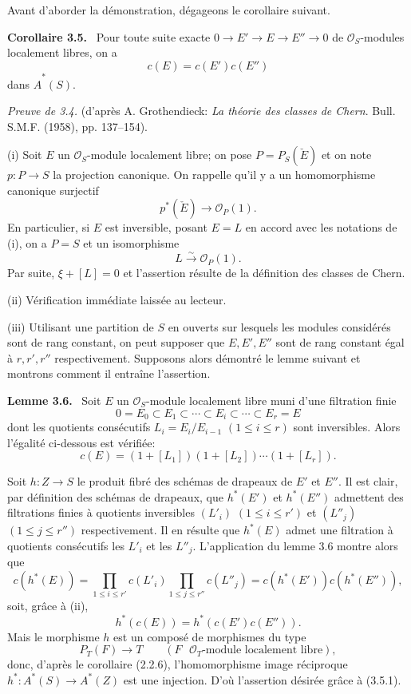 \documentclass[11pt]{article}
\newenvironment{statement}[1]{\par\medskip\noindent\textbf{#1.}\ }{\par\medskip}
\begin{document}
Avant d'aborder la démonstration, dégageons le corollaire suivant.

\begin{statement}{Corollaire 3.5}
Pour toute suite exacte $0\to E'\to E\to E''\to0$ de $\mathcal O_S$-modules localement libres, on a
\[
c(E)=c(E')c(E'')
\]
dans $\widehat A^*(S)$.
\end{statement}

\emph{Preuve de 3.4.} (d'après A. Grothendieck: \emph{La théorie des classes de Chern}. Bull. S.M.F. (1958), pp. 137--154).

(i) Soit $E$ un $\mathcal O_S$-module localement libre; on pose $P=P_S(\check E)$ et on note $p:P\to S$ la projection canonique. On rappelle qu'il y a un homomorphisme canonique surjectif
\[
p^*(\check E)\longrightarrow \mathcal O_P(1).
\]
En particulier, si $E$ est inversible, posant $E=L$ en accord avec les notations de (i), on a $P=S$ et un isomorphisme
\[
L\xrightarrow{\sim}\mathcal O_P(1).
\]
Par suite, $\xi+[L]=0$ et l'assertion résulte de la définition des classes de Chern.

(ii) Vérification immédiate laissée au lecteur.

(iii) Utilisant une partition de $S$ en ouverts sur lesquels les modules considérés sont de rang constant, on peut supposer que $E,E',E''$ sont de rang constant égal à $r,r',r''$ respectivement. Supposons alors démontré le lemme suivant et montrons comment il entraîne l'assertion.

\begin{statement}{Lemme 3.6}
Soit $E$ un $\mathcal O_S$-module localement libre muni d'une filtration finie
\[
0=E_0\subset E_1\subset\cdots\subset E_i\subset\cdots\subset E_r=E
\]
dont les quotients consécutifs $L_i=E_i/E_{i-1}$ $(1\le i\le r)$ sont inversibles. Alors l'égalité ci-dessous est vérifiée:
\[
c(E)=(1+[L_1])(1+[L_2])\cdots(1+[L_r]).
\]
\end{statement}

Soit $h:Z\to S$ le produit fibré des schémas de drapeaux de $E'$ et $E''$. Il est clair, par définition des schémas de drapeaux, que $h^*(E')$ et $h^*(E'')$ admettent des filtrations finies à quotients inversibles $(L'_i)$ $(1\le i\le r')$ et $(L''_j)$ $(1\le j\le r'')$ respectivement. Il en résulte que $h^*(E)$ admet une filtration à quotients consécutifs les $L'_i$ et les $L''_j$. L'application du lemme 3.6 montre alors que
\[
c(h^*(E))=
\prod_{1\le i\le r'}c(L'_i)\prod_{1\le j\le r''}c(L''_j)
=c(h^*(E'))c(h^*(E'')),
\]
soit, grâce à (ii),
\[
h^*(c(E))=h^*(c(E')c(E'')).
\tag{3.5.1}
\]
Mais le morphisme $h$ est un composé de morphismes du type
\[
P_T(F)\longrightarrow T
\qquad (F\text{ }\mathcal O_T\text{-module localement libre}),
\]
donc, d'après le corollaire (2.2.6), l'homomorphisme image réciproque $h^*:A^*(S)\to A^*(Z)$ est une injection. D'où l'assertion désirée grâce à (3.5.1).
\end{document}
